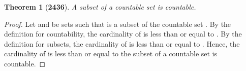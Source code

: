 \documentclass[preview]{standalone}
\newtheorem*{theorem*}{Theorem}
\begin{document}
\begin{theorem*}[\textbf{2436}]
    A subset of a countable set is countable.
\end{theorem*}

\begin{proof}
    Let  and \bm{$\Lambda$} be sets such that 
     is a subset of the countable set \bm{$\Lambda$}. 
    By the definition for countability,
    the cardinality of \bm{$\Lambda$} is less than or equal to . 
    By the definition for subsets, 
    the cardinality of 
    is less than or equal to \bm{$\Lambda$}.
    Hence,
    the cardinality of  is less than or equal to 
    \bm{$\therefore$} the subset of a countable set is countable.
\color{lightgray} \end{proof}
\end{document}
